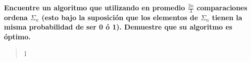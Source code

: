 \textbf{Encuentre un algoritmo que utilizando en promedio $\frac{2n}{3}$ comparaciones ordena $\Sigma_n$ (esto bajo la suposición que los elementos de $\Sigma_n$ tienen la misma probabilidad de ser 0 ó 1). Demuestre que su algoritmo es óptimo.}\vspace{.2cm}

\textcolor{bibi}{}
\begin{quote}1
\end{quote}